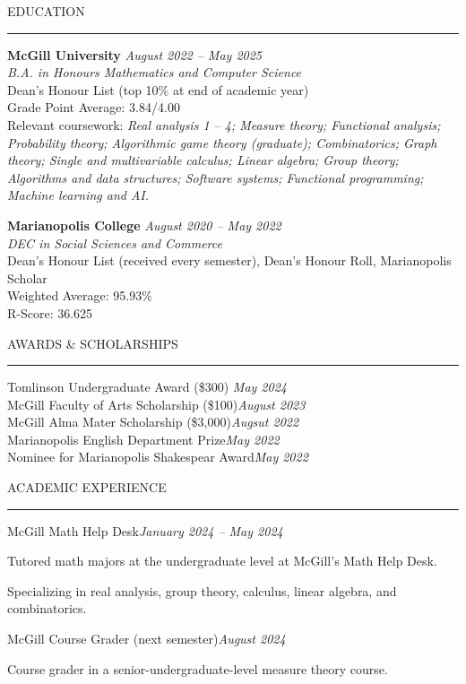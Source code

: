 \documentclass{resume}
\renewenvironment{rSection}[1]{
\sectionskip
\textcolor{LightB}{\MakeUppercase{#1}}
\sectionlineskip
\hrule
\begin{list}{}{
\setlength{\leftmargin}{1.5em}
}
\item[]
}{
\end{list}
}
\begin{document}
\begin{rSection}{Education}
{\bf McGill University} \hfill {\em August 2022 -- May 2025} 
\\ \emph{B.A. in Honours Mathematics and Computer Science} \hfill
\vspace{0.1cm}
\\ Dean's Honour List (top 10\% at end of academic year)
\\ Grade Point Average: 3.84/4.00 \hfill
\\ Relevant coursework: \textit{Real analysis 1 -- 4; Measure theory; Functional analysis; Probability theory; Algorithmic game theory (graduate); Combinatorics; Graph theory; Single and multivariable calculus; Linear algebra; Group theory; Algorithms and data structures; Software systems; Functional programming; Machine learning and AI.}

{\bf Marianopolis College} \hfill {\em August 2020 -- May 2022} 
\\ \emph{DEC in Social Sciences and Commerce}
\vspace{0.1cm}
\\ Dean's Honour List (received every semester), Dean's Honour Roll, Marianopolis Scholar
\\ Weighted Average: 95.93\%
\\ R-Score: 36.625
\end{rSection}

\begin{rSection}{Awards \& Scholarships} \itemsep -2pt
{Tomlinson Undergraduate Award (\$300)} \hfill {\em May 2024} \\
{McGill Faculty of Arts Scholarship (\$100)}\hfill {\em August 2023} \\
{McGill Alma Mater Scholarship (\$3,000)}\hfill {\em Augsut 2022} \\
{Marianopolis English Department Prize}\hfill {\em May 2022} \\
{Nominee for Marianopolis Shakespear Award}\hfill {\em May 2022}
\end{rSection}

\begin{rSection}{Academic Experience}
\begin{rSubsection}{McGill Math Help Desk}{\em January 2024 -- May 2024}{} 

\item Tutored math majors at the undergraduate level at McGill's Math Help Desk.
\item Specializing in real analysis, group theory, calculus, linear algebra, and combinatorics.
\end{rSubsection}
\begin{rSubsection}{McGill Course Grader (next semester)}{\em August 2024}{} 

\item Course grader in a senior-undergraduate-level measure theory course.
\end{rSubsection}
\end{rSection}
\end{document}
